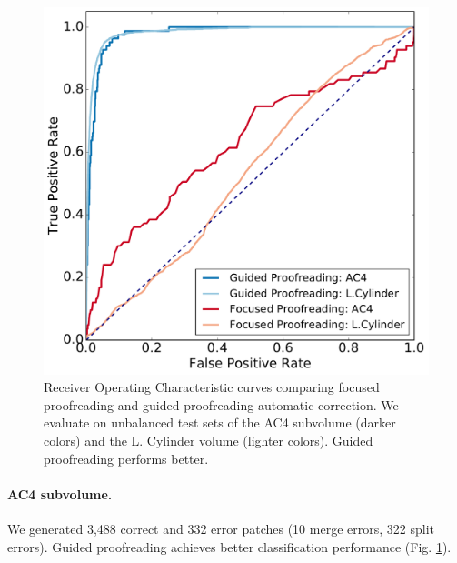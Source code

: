 \begin{figure}[t]
\centering
\includegraphics[width=0.9\linewidth]{gfx/roc.pdf}
\caption{Receiver Operating Characteristic curves comparing focused proofreading and guided proofreading automatic correction. We evaluate on unbalanced test sets of the AC4 subvolume (darker colors) and the L. Cylinder volume (lighter colors). Guided proofreading performs better.}
\label{fig:pr}
\end{figure}

\paragraph{AC4 subvolume.} We generated 3,488 correct and 332 error patches (10 merge errors, 322 split errors). Guided proofreading achieves better classification performance (Fig. \ref{fig:pr}).


